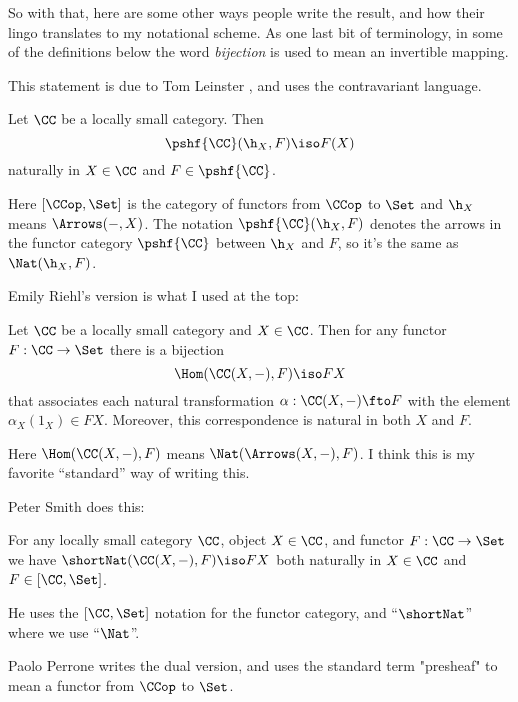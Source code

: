 So with that, here are some other ways people write the result, and how their lingo
translates to my notational scheme. As one last bit of terminology, in some of the
definitions below the word {\it bijection} is used to mean an invertible mapping.

\pg
This statement is due to Tom Leinster \cite{Leinster}, and uses the contravariant
language.

\begin{lemma}[Yoneda]   
\label{yoneda-leinster}
Let $\CC$ be a locally small category.  Then
%
$$
\pshf{\CC}(\h_X, F)
\iso
F(X)
$$
%
naturally in $X \in \CC$ and $F \in \pshf{\CC}$.  
\end{lemma}
\noindent
Here $[\CCop, \Set]$ is the category of functors from $\CCop$ to $\Set$ and 
$\h_X$ means $\Arrows(-,X)$.
The notation $\pshf{\CC}(\h_X, F)$ denotes the arrows in the functor
category $\pshf{\CC}$ between $\h_X$ and $F$, so it's the same as $\Nat(\h_X, F)$.

\pg
Emily Riehl's \cite{Riehl2016} version is what I used at the top:

\begin{lemma}[Yoneda]\label{yoneda-Riehl} Let $\CC$ be a locally small category and $X \in
\CC$. Then for any functor $F : \CC \to \Set$ there is a bijection
$$
\Hom(\CC(X,-), F) \iso FX
$$
that associates each natural transformation $\alpha:\CC(X,-) \fto F$ with the element
$\alpha_X(1_X) \in FX$. Moreover, this correspondence is natural in both $X$ and $F$.
\end{lemma}
\noindent
Here $\Hom(\CC(X,-), F)$ means $\Nat(\Arrows(X,-), F)$. I think this is my favorite
``standard'' way of writing this.

\pg
Peter Smith \cite{Smith} does this:

\begin{lemma}[Yoneda]\label{yoneda-smith} For any locally small category $\CC$, object $X
\in \CC$, and functor $F:\CC \to \Set$ we have  $\mathop{\shortNat}(\CC(X,-),F) \iso
FX$ both naturally in $X \in \CC$ and $F \in [\CC, \Set]$.
\end{lemma}
\noindent
He uses the $[\CC, \Set]$ notation for the functor category, and ``$\mathop{\shortNat}$''
where we use ``$\Nat$''.

\pg
Paolo Perrone \cite{Perrone} writes the dual version, and uses the standard term
"presheaf" to mean a functor from $\CCop$ to $\Set$.

